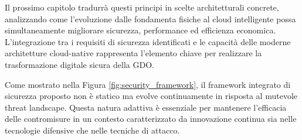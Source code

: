 Il prossimo capitolo tradurrà questi principi in scelte architetturali concrete, analizzando come l'evoluzione dalle fondamenta fisiche al cloud intelligente possa simultaneamente migliorare sicurezza, performance ed efficienza economica. L'integrazione tra i requisiti di sicurezza identificati e le capacità delle moderne architetture cloud-native rappresenta l'elemento chiave per realizzare la trasformazione digitale sicura della GDO.


Come mostrato nella Figura \ref{fig:security_framework}, il framework integrato di sicurezza proposto non è statico ma evolve continuamente in risposta al mutevole threat landscape. Questa natura adattiva è essenziale per mantenere l'efficacia delle contromisure in un contesto caratterizzato da innovazione continua sia nelle tecnologie difensive che nelle tecniche di attacco.

% 
\printbibliography[
    heading=subbibintoc,
    title={Riferimenti Bibliografici}
]